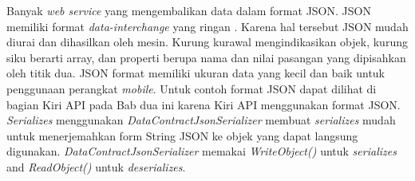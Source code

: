 Banyak \textit{web service} yang mengembalikan data dalam format JSON. JSON memiliki format \textit{data-interchange} yang ringan \cite{rfc7159}. Karena hal tersebut JSON mudah diurai dan dihasilkan oleh mesin. Kurung kurawal mengindikasikan objek, kurung siku berarti array, dan properti berupa nama dan nilai pasangan yang dipisahkan oleh titik dua. JSON format memiliki ukuran data yang kecil dan baik untuk penggunaan perangkat \textit{mobile}. Untuk contoh format JSON dapat dilihat di bagian Kiri API pada Bab dua ini karena Kiri API menggunakan format JSON. \textit{Serializes} menggunakan \textit{DataContractJsonSerializer} membuat \textit{serializes} mudah untuk menerjemahkan form String JSON ke objek yang dapat langsung digunakan. \textit{DataContractJsonSerializer} memakai \textit{WriteObject()} untuk \textit{serializes} and \textit{ReadObject()} untuk \textit{deserializes}.

